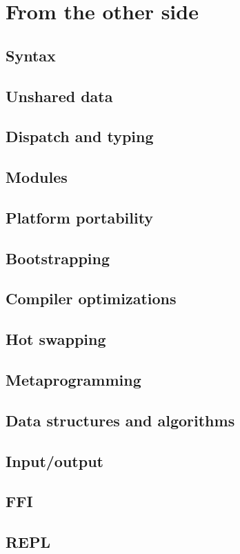 \documentclass[draft]{memoir}
\begin{document}
\part{From the other side}




\chapter{Syntax}
\chapter{Unshared data}
\chapter{Dispatch and typing}
\chapter{Modules}
\chapter{Platform portability}
\chapter{Bootstrapping}
\chapter{Compiler optimizations}
\chapter{Hot swapping}
\chapter{Metaprogramming}
\chapter{Data structures and algorithms}
\chapter{Input/output}
\chapter{FFI}
\chapter{REPL}
\end{document}
